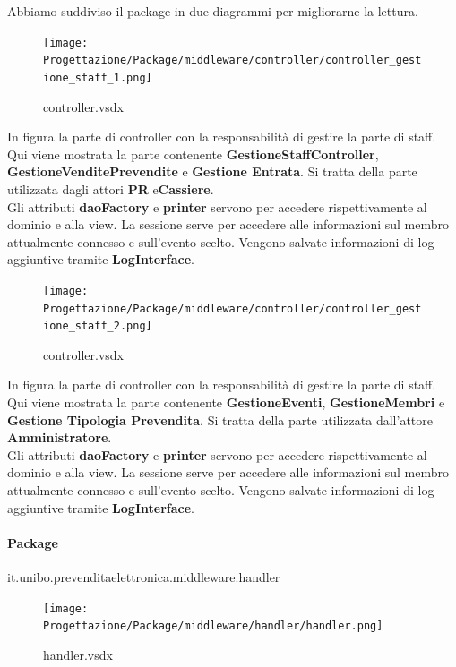 \documentclass[a4paper]{article}
\begin{document}
Abbiamo suddiviso il package in due diagrammi per migliorarne la lettura.

\begin{figure}[H]
    \texttt{[image: Progettazione/Package/middleware/controller/controller\_gestione\_staff\_1.png]}
    \centering
    \caption{controller.vsdx}
\end{figure}

In figura la parte di controller con la responsabilità di gestire la parte di staff. Qui viene mostrata la parte contenente \textbf{GestioneStaffController}, \textbf{GestioneVenditePrevendite} e \textbf{Gestione Entrata}. Si tratta della parte utilizzata dagli attori \textbf{PR} e\textbf{Cassiere}.\\Gli attributi \textbf{daoFactory} e \textbf{printer} servono per accedere rispettivamente al dominio e alla view. La sessione serve per accedere alle informazioni sul membro attualmente connesso e sull'evento scelto. Vengono salvate informazioni di log aggiuntive tramite \textbf{LogInterface}.

\begin{figure}[H]
    \texttt{[image: Progettazione/Package/middleware/controller/controller\_gestione\_staff\_2.png]}
    \centering
    \caption{controller.vsdx}
\end{figure}

In figura la parte di controller con la responsabilità di gestire la parte di staff. Qui viene mostrata la parte contenente \textbf{GestioneEventi}, \textbf{GestioneMembri} e \textbf{Gestione Tipologia Prevendita}. Si tratta della parte utilizzata dall'attore \textbf{Amministratore}.\\Gli attributi \textbf{daoFactory} e \textbf{printer} servono per accedere rispettivamente al dominio e alla view. La sessione serve per accedere alle informazioni sul membro attualmente connesso e sull'evento scelto. Vengono salvate informazioni di log aggiuntive tramite \textbf{LogInterface}.

\newpage

\paragraph{Package} it.unibo.prevenditaelettronica.middleware.handler


\begin{figure}[H]
    \texttt{[image: Progettazione/Package/middleware/handler/handler.png]}
    \centering
    \caption{handler.vsdx}
\end{figure}
\end{document}
